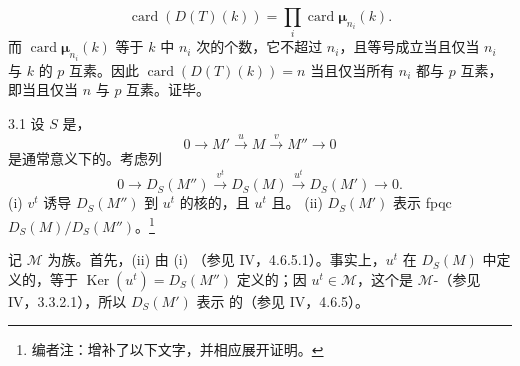 \[
\operatorname{card}(D(T)(k))=\prod_i\operatorname{card}\boldsymbol\mu_{n_i}(k).
\]
而 $\operatorname{card}\boldsymbol\mu_{n_i}(k)$ 等于 $k$ 中 $n_i$ 次的个数，它不超过 $n_i$，且等号成立当且仅当 $n_i$ 与 $k$ 的 $p$ 互素。因此 $\operatorname{card}(D(T)(k))=n$ 当且仅当所有 $n_i$ 都与 $p$ 互素，即当且仅当 $n$ 与 $p$ 互素。证毕。
\begin{SGAresult}{}{3.1}
设 $S$ 是，
\[
0\longrightarrow M'\xrightarrow{u}M\xrightarrow{v}M''\longrightarrow0
\]
是通常意义下的。考虑列
\[
0\longrightarrow D_S(M'')\xrightarrow{v^t}D_S(M)\xrightarrow{u^t}D_S(M')\longrightarrow0.
\]
(i) $v^t$ 诱导 $D_S(M'')$ 到 $u^t$ 的核的，且 $u^t$ 且。
(ii) $D_S(M')$ 表示 fpqc  $D_S(M)/D_S(M'')$。\footnote[12]{编者注：增补了以下文字，并相应展开证明。}
\end{SGAresult}
记 $\mathcal M$ 为族。首先，(ii) 由 (i) （参见 IV，4.6.5.1）。事实上，$u^t$ 在 $D_S(M)$ 中定义的，等于 $\operatorname{Ker}(u^t)=D_S(M'')$ 定义的；因 $u^t\in\mathcal M$，这个是 $\mathcal M$-（参见 IV，3.3.2.1），所以 $D_S(M')$ 表示 的（参见 IV，4.6.5）。

